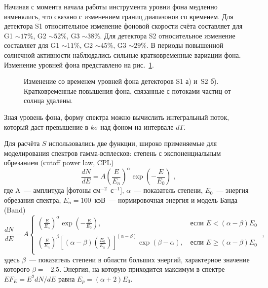 Начиная с момента начала работы инструмента уровни фона медленно изменялись, 
что связано с изменением границ диапазонов со временем. Для детектора S1 относительное 
изменение фоновой скорости счёта составляет для G1 $\sim 17$\%, G2 $\sim 52$\%, G3 $\sim 38$\%. 
Для детектора S2 относительное изменение составляет для G1 $\sim 11$\%, G2 $\sim 45$\%, G3 $\sim 29$\%. 
В периоды повышенной солнечной активности наблюдались сильные кратковременные вариации фона. 
Изменение уровней фона представлено на рис.~\ref{img:KW_bg_drift}.

\begin{figure}[h]
  \begin{minipage}[h]{0.5\textwidth}
  \end{minipage}
  \hfill
  \begin{minipage}[h]{0.5\textwidth}
  \end{minipage}
  \caption[Изменение со временем уровней фона детекторов S1 и~S2]
  {Изменение со временем уровней фона детекторов S1 а) и~S2 б). 
  Кратковременные повышения фона, связанные с потоками частиц от солнца удалены.}
  \label{img:KW_bg_drift}  
\end{figure}

Зная уровень фона, форму спектра можно вычислить интегральный поток, который 
даст превышение в $k\sigma$ над фоном на интервале $dT$.

Для расчёта $S$ использовались две функции, широко применяемые для моделирования 
спектров гамма-всплесков: степень с экспоненциальным обрезанием (сutoff power law, CPL)
\begin{equation}\label{eq:CPL}
\frac{dN}{dE} = A \left(\frac{E}{E_n}\right)^\alpha \exp\left(-\frac{E}{E_0}\right) \mbox{ ,}
\end{equation}
где A~--- амплитуда [фотоны см$^{-2}$~с$^{-1}$], $\alpha$~--- показатель степени,
$E_0$~--- энергия обрезания спектра, $E_n = 100$~кэВ~--- нормировочная энергия
и модель Банда (Band)~\citep{Band_1993ApJ}
\begin{equation}\label{eq:Band}
\frac{dN}{dE}=A \left\{
\begin{array}{lr}
\left(\frac{E}{E_n}\right)^\alpha \exp\left(-\frac{E}{E_0}\right) \mbox{, } 
&\mbox{если } E<(\alpha-\beta)E_0\\
\left(\frac{E}{E_n}\right)^\beta 
\left[(\alpha-\beta)\left(\frac{E_0}{E_n}\right)\right]^{(\alpha-\beta)} 
\exp(\beta-\alpha)  \mbox{, } &\mbox{если } E\geq(\alpha-\beta)E_0 \\
\end{array}
\right. \mbox{ ,}
\end{equation}
здесь $\beta$~--- показатель степени в области больших энергий, 
характерное значение которого $\beta = -2.5$. Энергия, на которую 
приходится максимум в спектре $E F_E = E^2 dN/dE$ равна $E_p=(\alpha+2) E_0$.

